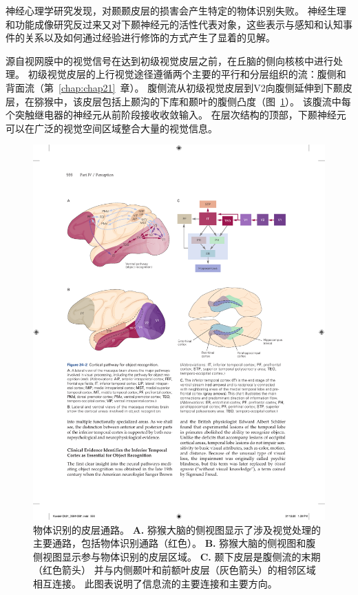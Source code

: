 神经心理学研究发现，对颞颞皮层的损害会产生特定的物体识别失败。
神经生理和功能成像研究反过来又对下颞神经元的活性代表对象，这些表示与感知和认知事件的关系以及如何通过经验进行修饰的方式产生了显着的见解。


源自视网膜中的视觉信号在达到初级视觉皮层之前，在丘脑的侧向核核中进行处理。
初级视觉皮层的上行视觉途径遵循两个主要的平行和分层组织的流：腹侧和背面流（第~\ref{chap:chap21}~章）。
腹侧流从初级视觉皮层到V2向腹侧延伸到下颞皮层，在猕猴中，该皮层包括上颞沟的下库和颞叶的腹侧凸度（图~\ref{fig:24_2}）。
该腹流中每个突触继电器的神经元从前阶段接收收敛输入。
在层次结构的顶部，下颞神经元可以在广泛的视觉空间区域整合大量的视觉信息。


\begin{figure}[htbp]
	\centering
	\includegraphics[width=0.95\linewidth]{chap24/fig_24_2}
	\caption{物体识别的皮层通路。
		\textbf{A.} 猕猴大脑的侧视图显示了涉及视觉处理的主要通路，包括物体识别通路（红色）。
		\textbf{B.} 猕猴大脑的侧视图和腹侧视图显示参与物体识别的皮层区域。
		\textbf{C.} 颞下皮层是腹侧流的末期（红色箭头） 并与内侧颞叶和前额叶皮层（灰色箭头）的相邻区域相互连接。
		此图表说明了信息流的主要连接和主要方向。}
	\label{fig:24_2}
\end{figure}


